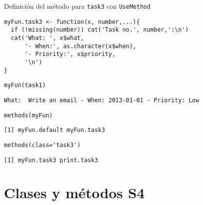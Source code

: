 \documentclass[xcolor={usenames,svgnames,dvipsnames}]{beamer}
\begin{document}
\begin{frame}[fragile,label=sec-2-3-3]{Definición del método para \texttt{task3} con \texttt{UseMethod}}
 \lstset{language=R,numbers=none}
\begin{lstlisting}
myFun.task3 <- function(x, number,...){
  if (!missing(number)) cat('Task no.', number,':\n')
  cat('What: ', x$what,
      '- When:', as.character(x$when),
      '- Priority:', x$priority,
      '\n')
}
\end{lstlisting}

\lstset{language=R,numbers=none}
\begin{lstlisting}
myFun(task1)
\end{lstlisting}

\begin{verbatim}
What:  Write an email - When: 2013-01-01 - Priority: Low
\end{verbatim}

\lstset{language=R,numbers=none}
\begin{lstlisting}
methods(myFun)
\end{lstlisting}

\begin{verbatim}
[1] myFun.default myFun.task3
\end{verbatim}

\lstset{language=R,numbers=none}
\begin{lstlisting}
methods(class='task3')
\end{lstlisting}

\begin{verbatim}
[1] myFun.task3 print.task3
\end{verbatim}
\end{frame}
\section{Clases y métodos S4}
\label{sec-3}
\end{document}
